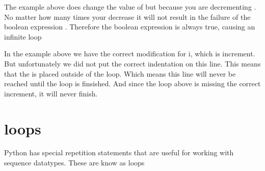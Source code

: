 \documentclass[letterpaper,10pt,english]{jupyterBook}
\begin{document}
\sphinxAtStartPar
The example above does change the value of  but because you are decrementing . No matter how many times your decrease  it will not result in the failure of the boolean expression . Therefore the boolean expression is always true, causing an infinite loop

\begin{sphinxVerbatim}[commandchars=\\\{\}]
   
   
    
\end{sphinxVerbatim}

\sphinxAtStartPar
In the example above we have the correct modification for i, which is increment. But unfortunately we did not put the correct indentation on this line. This means that the  is placed outside of the loop. Which means this line will never be reached until the loop is finsished. And since the loop above is missing the correct increment, it will never finish.


\section{ loops}
\label{\detokenize{loops:for-loops}}
\sphinxAtStartPar
Python has special repetition statements that are useful for working with sequence datatypes. These are know as  loops
\end{document}
